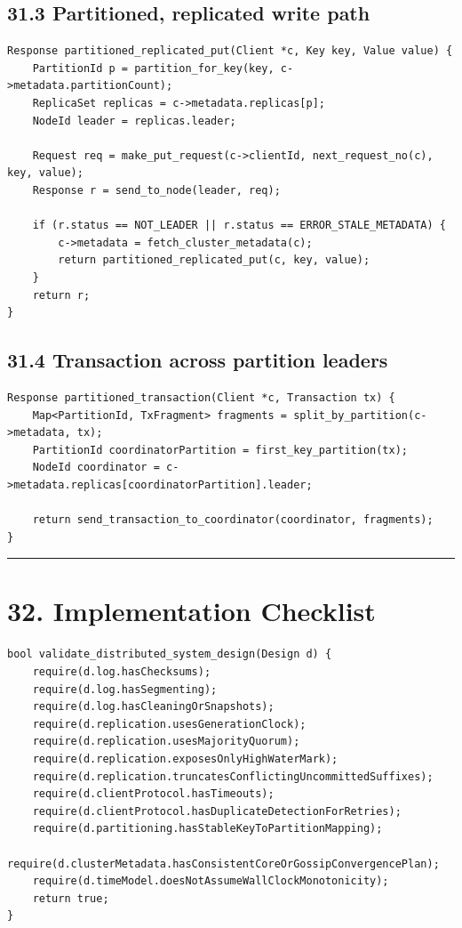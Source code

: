 \documentclass[10pt,letterpaper]{article}
\begin{document}
\subsection*{31.3 Partitioned, replicated write path}

\begin{verbatim}
Response partitioned_replicated_put(Client *c, Key key, Value value) {
    PartitionId p = partition_for_key(key, c->metadata.partitionCount);
    ReplicaSet replicas = c->metadata.replicas[p];
    NodeId leader = replicas.leader;

    Request req = make_put_request(c->clientId, next_request_no(c), key, value);
    Response r = send_to_node(leader, req);

    if (r.status == NOT_LEADER || r.status == ERROR_STALE_METADATA) {
        c->metadata = fetch_cluster_metadata(c);
        return partitioned_replicated_put(c, key, value);
    }
    return r;
}
\end{verbatim}

\subsection*{31.4 Transaction across partition leaders}

\begin{verbatim}
Response partitioned_transaction(Client *c, Transaction tx) {
    Map<PartitionId, TxFragment> fragments = split_by_partition(c->metadata, tx);
    PartitionId coordinatorPartition = first_key_partition(tx);
    NodeId coordinator = c->metadata.replicas[coordinatorPartition].leader;

    return send_transaction_to_coordinator(coordinator, fragments);
}
\end{verbatim}

\medskip\hrule\medskip

\clearpage
\section*{32. Implementation Checklist}

\begin{verbatim}
bool validate_distributed_system_design(Design d) {
    require(d.log.hasChecksums);
    require(d.log.hasSegmenting);
    require(d.log.hasCleaningOrSnapshots);
    require(d.replication.usesGenerationClock);
    require(d.replication.usesMajorityQuorum);
    require(d.replication.exposesOnlyHighWaterMark);
    require(d.replication.truncatesConflictingUncommittedSuffixes);
    require(d.clientProtocol.hasTimeouts);
    require(d.clientProtocol.hasDuplicateDetectionForRetries);
    require(d.partitioning.hasStableKeyToPartitionMapping);
    require(d.clusterMetadata.hasConsistentCoreOrGossipConvergencePlan);
    require(d.timeModel.doesNotAssumeWallClockMonotonicity);
    return true;
}
\end{verbatim}
\end{document}
